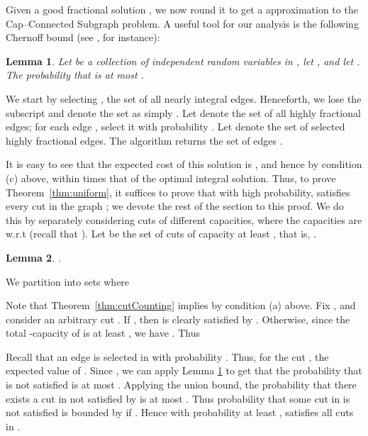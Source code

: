 \documentclass[11pt]{article}
\newcounter{thm0Rcopies}
\newcounter{thm_saved}
\newtheorem{lemma}{Lemma}[section]
\def\capR{Cap--Connected Subgraph\xspace}
\renewenvironment{proof}{\vspace{-0.1in}\noindent{\bf Proof:}}{\hspace*{\fill}\par}
\begin{document}
Given a good fractional solution , we now round it to get a  approximation to the \capR problem.  A useful tool for our
analysis is the following Chernoff bound (see \cite{MR}, for
instance):

\begin{lemma}\label{lem:Chernoff}
  Let  be a collection of independent random
  variables in , let , and let . The probability that  is at
  most .
\end{lemma}

We start by selecting , the set of all nearly integral edges.
Henceforth, we lose the subscript and denote the set as simply .
Let  denote the set of all highly fractional edges;
for each edge , select it with probability . Let  denote the set of selected highly
fractional edges. The algorithm returns the set of edges .

It is easy to see that the expected cost of this solution  is
, and hence by condition (c) above,
within  times that of the optimal integral solution. Thus,
to prove Theorem~\ref{thm:uniform}, it suffices to prove that with high
probability,  satisfies every cut in the graph ; we devote the
rest of the section to this proof.  We do this by separately
considering cuts of different capacities, where the capacities are
w.r.t  (recall that ). Let  be the set of
cuts of capacity at least , that is, .

\def\L{{\mathcal L}}
\begin{lemma}\label{lem:largeCuts}
  .
\end{lemma}
\begin{proof}
  We partition  into sets  where
  
  Note that
  Theorem~\ref{thm:cutCounting} implies  by
  condition (a) above.
Fix , and consider an arbitrary cut . If , then  is clearly satisfied by
  . Otherwise, since the total -capacity of  is at least
  , we have . Thus

  
  Recall that an edge  is selected in  with probability
  . Thus, for the cut , the expected value of
  . Since , we can apply Lemma \ref{lem:Chernoff} to
  get that the probability that  is not satisfied is at most
  .  Applying the union bound, the
  probability that there exists a cut in  not satisfied by 
  is at most . Thus probability that
  some cut in  is not satisfied is bounded by  if .
  Hence with probability at least ,
   satisfies all cuts in .
\end{proof}
\end{document}
